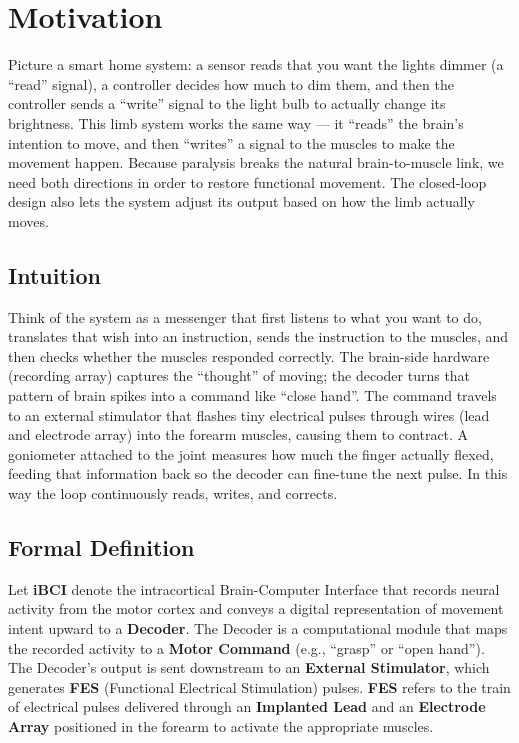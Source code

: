 \documentclass[12pt, a4paper]{article}
\begin{document}
\section{Motivation}
Picture a smart home system: a sensor reads that you want the lights dimmer (a ``read'' signal), a controller decides how much to dim them, and then the controller sends a ``write'' signal to the light bulb to actually change its brightness. This limb system works the same way --- it ``reads'' the brain's intention to move, and then ``writes'' a signal to the muscles to make the movement happen. Because paralysis breaks the natural brain-to-muscle link, we need both directions in order to restore functional movement. The closed-loop design also lets the system adjust its output based on how the limb actually moves.

\subsection{Intuition}
Think of the system as a messenger that first listens to what you want to do, translates that wish into an instruction, sends the instruction to the muscles, and then checks whether the muscles responded correctly. The brain-side hardware (recording array) captures the ``thought'' of moving; the decoder turns that pattern of brain spikes into a command like ``close hand''. The command travels to an external stimulator that flashes tiny electrical pulses through wires (lead and electrode array) into the forearm muscles, causing them to contract. A goniometer attached to the joint measures how much the finger actually flexed, feeding that information back so the decoder can fine-tune the next pulse. In this way the loop continuously reads, writes, and corrects.

\subsection{Formal Definition}
Let \textbf{iBCI} denote the intracortical Brain-Computer Interface that records neural activity from the motor cortex and conveys a digital representation of movement intent upward to a \textbf{Decoder}. The Decoder is a computational module that maps the recorded activity to a \textbf{Motor Command} (e.g., ``grasp'' or ``open hand''). The Decoder's output is sent downstream to an \textbf{External Stimulator}, which generates \textbf{FES} (Functional Electrical Stimulation) pulses. \textbf{FES} refers to the train of electrical pulses delivered through an \textbf{Implanted Lead} and an \textbf{Electrode Array} positioned in the forearm to activate the appropriate muscles.  
\end{document}
